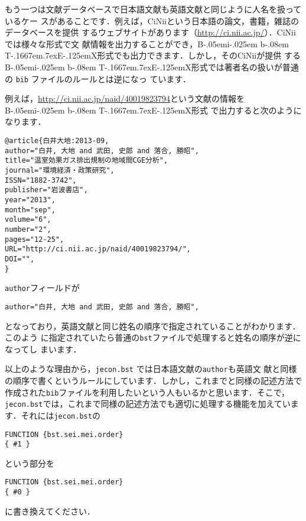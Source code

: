 \documentclass[a4j,10pt]{jarticle}
\def\BibTeX{{\rm B\kern-.05em{\sc i\kern-.025em b}\kern-.08em
    T\kern-.1667em\lower.7ex\hbox{E}\kern-.125emX}}
\begin{document}
もう一つは文献データベースで日本語文献も英語文献と同じように人名を扱っているケー
スがあることです．例えば，CiNiiという日本語の論文，書籍，雑誌のデータベースを提供
するウェブサイトがあります（\url{http://ci.nii.ac.jp/}）．CiNiiでは様々な形式で文
献情報を出力することができ，\BibTeX 形式でも出力できます．しかし，そのCiNiiが提供
する \BibTeX 形式では著者名の扱いが普通の \texttt{bib} ファイルのルールとは逆になっ
ています．

例えば，\url{http://ci.nii.ac.jp/naid/40019823794}という文献の情報を \BibTeX 形式
で出力すると次のようになります．
\begin{screen}
\begin{verbatim}
@article{白井大地:2013-09,
author="白井, 大地 and 武田, 史郎 and 落合, 勝昭",
title="温室効果ガス排出規制の地域間CGE分析",
journal="環境経済・政策研究",
ISSN="1882-3742",
publisher="岩波書店",
year="2013",
month="sep",
volume="6",
number="2",
pages="12-25",
URL="http://ci.nii.ac.jp/naid/40019823794/",
DOI="",
}
\end{verbatim}
\end{screen}
\texttt{author}フィールドが
\begin{screen}
\begin{verbatim}
author="白井, 大地 and 武田, 史郎 and 落合, 勝昭",
\end{verbatim}
\end{screen}
となっており，英語文献と同じ姓名の順序で指定されていることがわかります．このよう
に指定されていたら普通の\texttt{bst}ファイルで処理すると姓名の順序が逆になってし
まいます．

\vspace*{1em}

以上のような理由から，\texttt{jecon.bst} では日本語文献の\texttt{author}も英語文
献と同様の順序で書くというルールにしています．しかし，これまでと同様の記述方法で
作成された\texttt{bib}ファイルを利用したいという人もいるかと思います．そこで，
\texttt{jecon.bst}では，これまで同様の記述方法でも適切に処理する機能を加えていま
す．それには\texttt{jecon.bst}の
\begin{screen}
\begin{verbatim}
FUNCTION {bst.sei.mei.order}
{ #1 }
\end{verbatim}
\end{screen}
という部分を
\begin{screen}
\begin{verbatim}
FUNCTION {bst.sei.mei.order}
{ #0 }
\end{verbatim}
\end{screen}
に書き換えてください．
\end{document}
